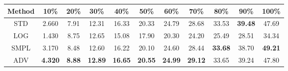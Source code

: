 \documentclass{standalone}
\begin{document}
\begin{tabular}{c|cccccccccc}
      \toprule
      Method & 10\% & 20\% & 30\% & 40\% & 50\% & 60\% & 70\% & 80\% & 90\% & 100\% \\
      \midrule
STD & 2.660 & 7.91 & 12.31 & 16.33 & 20.33 & 24.79 & 28.68 & 33.53 & \textbf{39.48} & 47.69\\
LOG & 1.430 & 8.75 & 12.65 & 15.08 & 17.90 & 20.30 & 24.20 & 25.49 & 28.51 & 34.34\\
SMPL & 3.170 & 8.48 & 12.60 & 16.22 & 20.10 & 24.60 & 28.44 & \textbf{33.68} & 38.70 & \textbf{49.21}\\
ADV & \textbf{4.320} & \textbf{8.88} & \textbf{12.89} & \textbf{16.65} & \textbf{20.55} & \textbf{24.99} & \textbf{29.12} & 33.65 & 39.24 & 47.80\\
  \bottomrule
\end{tabular}
\end{document}
